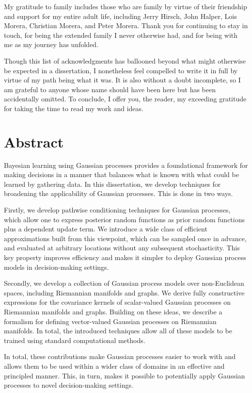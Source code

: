 \documentclass[11pt]{book}
\begin{document}
My gratitude to family includes those who are family by virtue of their friendship and support for my entire adult life, including Jerry Hirsch, John Halper, Lois Morera, Christian Morera, and Peter Morera.
Thank you for continuing to stay in touch, for being the extended family I never otherwise had, and for being with me as my journey has unfolded.

Though this list of acknowledgments has ballooned beyond what 
might otherwise be expected in a dissertation, I nonetheless feel compelled to write it in full by virtue of my path being what it was.
It is also without a doubt incomplete, so I am grateful to anyone whose name should have been here but has been accidentally omitted.
To conclude, I offer you, the reader, my exceeding gratitude for taking the time to read my work and ideas.

\chapter*{Abstract}

Bayesian learning using Gaussian processes provides a foundational framework for making decisions in a manner that balances what is known with what could be learned by gathering data. 
In this dissertation, we develop techniques for broadening the applicability of Gaussian processes.
This is done in two ways.

Firstly, we develop pathwise conditioning techniques for Gaussian processes, which allow one to express posterior random functions as prior random functions plus a dependent update term.
We introduce a wide class of efficient approximations built from this viewpoint, which can be sampled once in advance, and evaluated at arbitrary locations without any subsequent stochasticity.
This key property improves efficiency and makes it simpler to deploy Gaussian process models in decision-making settings.

Secondly, we develop a collection of Gaussian process models over non-Euclidean spaces, including Riemannian manifolds and graphs.
We derive fully constructive expressions for the covariance kernels of scalar-valued Gaussian processes on Riemannian manifolds and graphs.
Building on these ideas, we describe a formalism for defining vector-valued Gaussian processes on Riemannian manifolds. 
In total, the introduced techniques allow all of these models to be trained using standard computational methods.

In total, these contributions make Gaussian processes easier to work with and allows them to be used within a wider class of domains in an effective and principled manner.
This, in turn, makes it possible to potentially apply Gaussian processes to novel decision-making settings.
\end{document}
